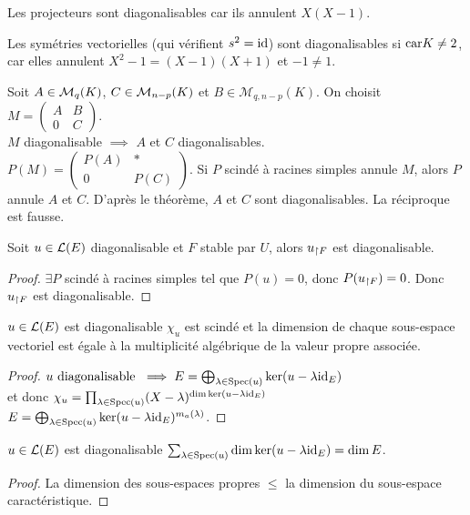\begin{example}
	Les projecteurs sont diagonalisables car ils annulent $X(X-1)$.

	Les symétries vectorielles (qui vérifient $s^2 = \text{id}$) sont diagonalisables
	si $\text{car} K \neq 2$, car elles annulent $X^2 - 1 = (X-1)(X+1)$ et $-1 \neq 1$.
\end{example}


\begin{example}
	Soit $A \in \mathcal{M}_{q}(K)$, $C \in \mathcal{M}_{n-p}(K)$ et $B \in \mathcal{M}_{q, n-p}(K)$.
	On choisit $M = \begin{pmatrix} A & B \\ 0 & C \end{pmatrix}$.\\
	$M$ diagonalisable $\implies$ $A$ et $C$ diagonalisables.\\
	$P(M) = \begin{pmatrix} P(A) & * \\ 0 & P(C) \end{pmatrix}$. Si $P$ scindé à racines simples annule $M$, alors $P$ annule $A$ et $C$.
	D'après le théorème, $A$ et $C$ sont diagonalisables.
	La réciproque est fausse.
\end{example}


\begin{prop}
	Soit $u \in \mathcal{L}(E)$ diagonalisable et $F$ stable par $U$, alors $u_{\restriction F} $ est diagonalisable.
\end{prop}

\begin{proof}
	$\exists P$ scindé à racines simples tel que $P(u) = 0$, donc $P(u_{\restriction F}) = 0$. Donc $u_{\restriction F}$ est diagonalisable.
\end{proof}


\begin{theorem}
	$u \in \mathcal{L}(E)$ est diagonalisable \ssi $\chi_u$ est scindé et la dimension de chaque sous-espace vectoriel est égale à la multiplicité
	algébrique de la valeur propre associée.
\end{theorem}

\begin{proof}
	$u \text{ diagonalisable } \implies E = \bigoplus_{\lambda \in \text{Spec}(u)} \ker(u - \lambda \text{id}_E)$\\
	et donc $\chi_u = \prod_{\lambda \in \text{Spec}(u)} (X - \lambda)^{\dim \ker(u - \lambda \text{id}_E)}$\\
	$E = \bigoplus_{\lambda \in \text{Spec}(u)} \ker(u - \lambda \text{id}_E)^{m_a(\lambda)}$.

\end{proof}


\begin{coro}
	$u \in \mathcal{L}(E)$ est diagonalisable \ssi $\sum_{\lambda \in \text{Spec}(u)} \dim \ker(u - \lambda \text{id}_E) = \dim E$.
\end{coro}

\begin{proof}
	La dimension des sous-espaces propres $\leq$ la dimension du sous-espace caractéristique. %
\end{proof}
